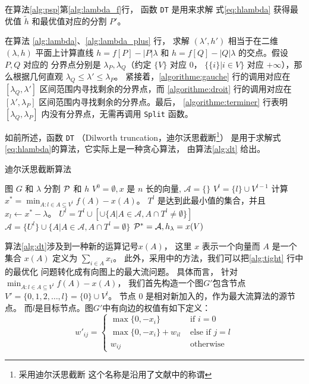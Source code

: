 在算法\ref{alg:psp}第\ref{alg:lambda_f}行，
函数 \texttt{DT} 是用来求解 式\ref{eq:hlambda} 获得最优值
$\tilde{h}$ 和最优值对应的分割 $P'$。

在算法 \ref{alg:lambda}、\ref{alg:lambda_plus} 行，
求解 $(\lambda', h')$ 相当于在二维 $(\lambda, h)$
平面上计算直线
$h = f[P] - |P| \lambda $
和 $h = f[Q] - |Q| \lambda $ 的交点。假设 $P, Q$ 对应的
分界点分别是 $\lambda_P, \lambda_Q$（约定 $\{V\}$ 对应 0，
$\{\{i\}|i\in V\}$ 对应 $+\infty$），那么根据几何直观
$\lambda_Q \leq \lambda' \leq \lambda_P$。
紧接着，\ref{algorithme:gauche} 行的调用对应在
$[\lambda_Q, \lambda']$
区间范围内寻找剩余的分界点，而
\ref{algorithme:droit} 行的调用对应在
$[\lambda', \lambda_P]$
区间范围内寻找剩余的分界点。最后，
\ref{algorithme:terminer} 行表明
$[\lambda_Q, \lambda_P]$ 内没有分界点，无需再调用
\texttt{Split} 函数。

如前所述，函数 \texttt{DT}
（Dilworth truncation，迪尔沃思截断\footnote{采用迪尔沃思截断
这个名称是沿用了文献\cite{mac}中的称谓}）
是用于求解式\eqref{eq:hlambda}的算法，它实际上是一种贪心算法，
由算法\ref{alg:dt} 给出。

\begin{algorithm}
  \caption{迪尔沃思截断算法}\label{alg:dt}
  \begin{algorithmic}[1]
  \REQUIRE 图 $G$ 和 $\lambda$
  \ENSURE 分割 $\P$ 和 $h$
  \STATE
  $V^0 = \emptyset, x $ 是 $n$ 长的向量\footnotemark[1],
  $\mathcal{A} = \{\}$
  \STATE $V^l = \{l\} \cup V^{l-1}$
  \STATE\label{alg:tight} 计算 $x^* = \displaystyle\min_{ A: l \in A \subseteq V^l} f(A)- x(A)$。
   $T^l$ 是达到此最小值的集合，并且 $x_l \leftarrow x^* - \lambda$。 
    \STATE $U^l = T^l \cup [\cup \{A | A \in \mathcal{A}, A \cap T^l \neq \emptyset\}] $
  \STATE $\mathcal{A} = \{U^l\} \cup \{A | A \in \mathcal{A}, A \cap T^l = \emptyset \}$
  \ENDFOR
  \STATE $\P^* = \mathcal{A}, h_{\lambda} = x(V)$
  \end{algorithmic}
  \end{algorithm}

算法\ref{alg:dt}涉及到一种新的运算记号$x(A)$，
这里 $x$ 表示一个向量而 $A$ 是一个集合
$x(A)$ 定义为 $\sum_{i \in A} x_i$。
此外，采用\cite{pin}中的方法，我们可以把\ref{alg:tight} 行中的最优化
问题转化成有向图上的最大流问题。
具体而言，
针对 $\displaystyle\min_{ A: l \in A \subseteq V^l} f(A)- x(A)$，
我们首先构造一个图$G'$包含节点$V'=\{0, 1, 2, \dots, l\}=\{0\} \cup V^l$。
节点 $0$ 是相对新加入的，作为最大流算法的源节点。
而$l$是目标节点。图$G'$中有向边的权值有如下定义：
\begin{equation}\label{eq:wij_prime}
  w'_{ij} = \begin{cases}
    \max\{0, -x_{i}\} & \textrm{ if } i = 0 \\
    \max\{0, -x_{i}\} + w_{il} & \textrm{ else if } j = l \\
    w_{ij} & \textrm{ otherwise }
  \end{cases}
\end{equation}

